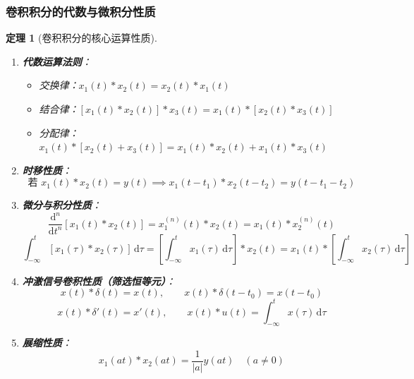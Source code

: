 \documentclass[11pt,a4paper,fontset=fandol]{ctexart}
\newtheorem{theorem}{定理}[section]
\theoremstyle{remark}
\begin{document}
\subsubsection{卷积积分的代数与微积分性质}
\begin{theorem}[卷积积分的核心运算性质]
\begin{enumerate}
    \item \textbf{代数运算法则}：
    \begin{itemize}
        \item 交换律：$x_1(t) * x_2(t) = x_2(t) * x_1(t)$
        \item 结合律：$[x_1(t) * x_2(t)] * x_3(t) = x_1(t) * [x_2(t) * x_3(t)]$
        \item 分配律：$x_1(t) * [x_2(t) + x_3(t)] = x_1(t) * x_2(t) + x_1(t) * x_3(t)$
    \end{itemize}
    \item \textbf{时移性质}：
    \begin{equation}
        \text{若 } x_1(t) * x_2(t) = y(t) \implies x_1(t - t_1) * x_2(t - t_2) = y(t - t_1 - t_2)
    \end{equation}
    \item \textbf{微分与积分性质}：
    \begin{equation}
        \frac{\mathrm{d}^n}{\mathrm{d}t^n}[x_1(t) * x_2(t)] = x_1^{(n)}(t) * x_2(t) = x_1(t) * x_2^{(n)}(t)
    \end{equation}
    \begin{equation}
        \int_{-\infty}^t [x_1(\tau) * x_2(\tau)]\,\mathrm{d}\tau = \left[\int_{-\infty}^t x_1(\tau)\,\mathrm{d}\tau\right] * x_2(t) = x_1(t) * \left[\int_{-\infty}^t x_2(\tau)\,\mathrm{d}\tau\right]
    \end{equation}
    \item \textbf{冲激信号卷积性质（筛选恒等元）}：
    \begin{equation}
        x(t) * \delta(t) = x(t), \qquad x(t) * \delta(t - t_0) = x(t - t_0)
    \end{equation}
    \begin{equation}
        x(t) * \delta'(t) = x'(t), \qquad x(t) * u(t) = \int_{-\infty}^t x(\tau)\,\mathrm{d}\tau
    \end{equation}
    \item \textbf{展缩性质}：
    \begin{equation}
        x_1(at) * x_2(at) = \frac{1}{|a|} y(at) \quad (a \neq 0)
    \end{equation}
\end{enumerate}
\end{theorem}
\end{document}
